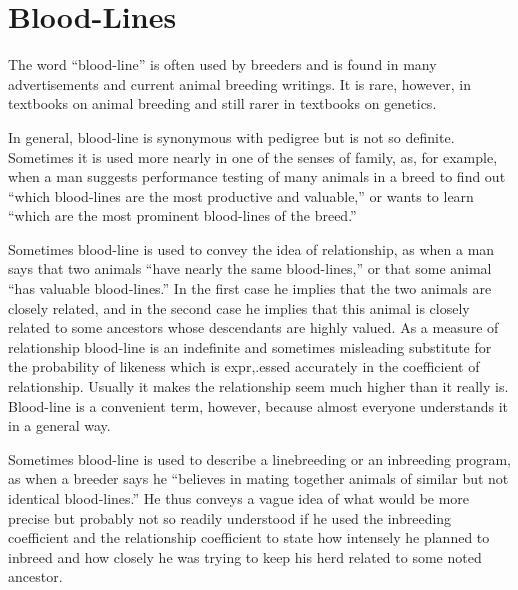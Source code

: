 \chapter{Blood-Lines}
\label{cha:Lush_Chapter_25}

The word ``blood-line'' is often used by breeders and is found in
many advertisements and current animal breeding writings. It is rare,
however, in textbooks on animal breeding and still rarer in textbooks
on genetics.

In general, blood-line is synonymous with pedigree but is not so
definite. Sometimes it is used more nearly in one of the senses of family,
as, for example, when a man suggests performance testing of many
animals in a breed to find out ``which blood-lines are the most productive
and valuable,'' or wants to learn ``which are the most prominent
blood-lines of the breed.''

Sometimes blood-line is used to convey the idea of relationship, as
when a man says that two animals ``have nearly the same blood-lines,''
or that some animal ``has valuable blood-lines.'' In the first case he
implies that the two animals are closely related, and in the second case
he implies that this animal is closely related to some ancestors whose
descendants are highly valued. As a measure of relationship blood-line
is an indefinite and sometimes misleading substitute for the probability
of likeness which is expr,.essed accurately in the coefficient of relationship.
Usually it makes the relationship seem much higher than it really
is. Blood-line is a convenient term, however, because almost everyone
understands it in a general way.

Sometimes blood-line is used to describe a linebreeding or an
inbreeding program, as when a breeder says he ``believes in mating
together animals of similar but not identical blood-lines.'' He thus conveys
a vague idea of what would be more precise but probably not so
readily understood if he used the inbreeding coefficient and the relationship
coefficient to state how intensely he planned to inbreed and
how closely he was trying to keep his herd related to some noted
ancestor.


